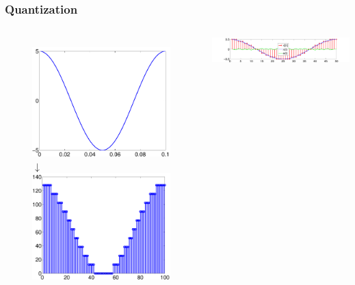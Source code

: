 \documentclass[mathserif,9pt]{beamer}
\begin{document}
\begin{frame}\frametitle{Quantization}\small
  \begin{columns}
    \begin{figure}
    \centering
    \includegraphics[height=.35\textheight]{sampling_p0.pdf}\\
    $\downarrow$ \\
    \includegraphics[height=.35\textheight]{sampling_p2.pdf}
    \end{figure}
    \includegraphics[width=\textwidth]{q_err.pdf} \\
    \vspace{1em}
    

\end{columns}
\end{frame}
\end{document}

